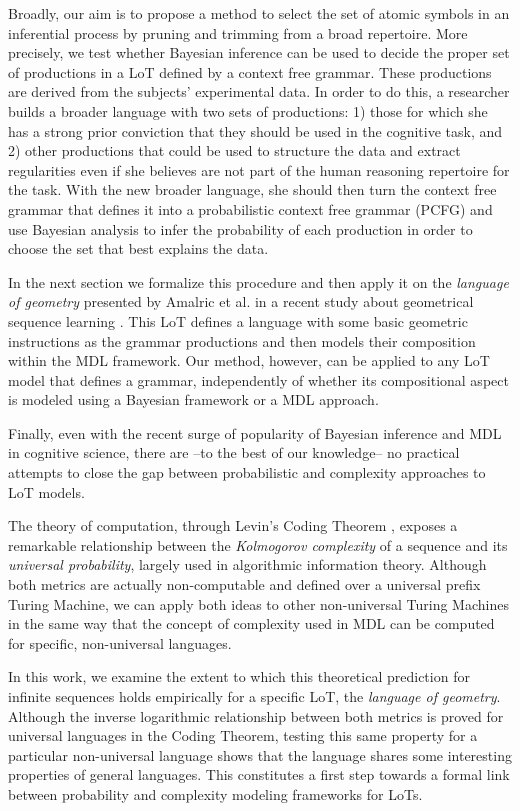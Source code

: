 Broadly, our aim is to propose a method to select the set of atomic symbols in an inferential process by pruning and trimming from a broad repertoire. More precisely, we test whether Bayesian inference can be used to decide the proper set of productions in a LoT defined by a context free grammar. These productions are derived from the subjects' experimental data. In order to do this, a researcher builds a broader language with two sets of productions: 1) those for which she has a strong prior conviction that they should be used in the cognitive task, and 2) other productions that could be used to structure the data and extract regularities even if she believes are not part of the human reasoning repertoire for the task. With the new broader language, she should then turn the context free grammar that defines it into a probabilistic context free grammar (PCFG) and use Bayesian analysis to infer the probability of each production in order to choose the set that best explains the data.

In the next section we formalize this procedure and then apply it on the \textit{language of geometry} presented by Amalric et al. in a recent study about geometrical sequence learning \cite{marie2016}. This LoT defines a language with some basic geometric instructions as the grammar productions and then models their composition within the MDL framework. Our method, however, can be applied to any LoT model that defines a grammar, independently of whether its compositional aspect is modeled using a Bayesian framework or a MDL approach.

Finally, even with the recent surge of popularity of Bayesian inference and MDL in cognitive science, there are --to the best of our knowledge-- no practical attempts to close the gap between probabilistic and complexity approaches to LoT models.

The theory of computation, through Levin's Coding Theorem \cite{levin1974laws}, exposes a remarkable relationship between the {\em Kolmogorov complexity} of a sequence and its {\em universal probability}, largely used in algorithmic information theory. Although both metrics are actually non-computable and defined over a universal prefix Turing Machine, we can apply both ideas to other non-universal Turing Machines in the same way that the concept of complexity used in MDL can be computed for specific, non-universal languages.

In this work, we examine the extent to which this theoretical prediction for infinite sequences holds empirically for a specific LoT, the \textit{language of geometry}. Although the inverse logarithmic relationship between both metrics is proved for universal languages in the Coding Theorem, testing this same property for a particular non-universal language shows that the language shares some interesting properties of general languages. This constitutes a first step towards a formal link between probability and complexity modeling frameworks for LoTs.

